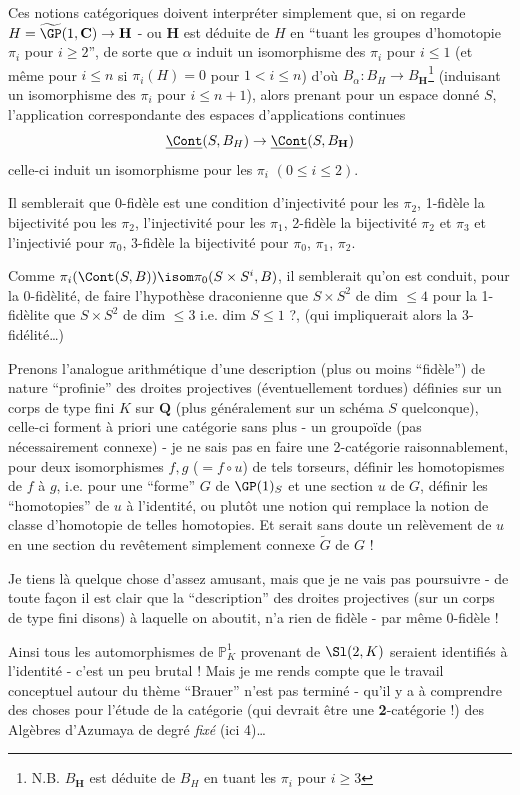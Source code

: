 Ces notions catégoriques doivent interpréter simplement que, si on regarde $H = \widetilde{\GP}(1, \mathbf{C}) \to \mathbf{H}$ - ou $\mathbf{H}$ est déduite de $H$ en ``tuant les groupes d'homotopie $\pi_i$ pour $i \geq 2$'', de sorte que $\alpha$ induit un isomorphisme des $\pi_i$ pour $i \leq 1$ (et même pour $i \leq n$ si $\pi_i (H) = 0$ pour $1 < i \leq n$) d'où $B_\alpha: B_H \to B_{\mathbf{H}}$\footnote{N.B. $B_{\mathbf{H}}$ est déduite de $B_H$ en tuant les $\pi_i$ pour $i \geq 3$} (induisant un isomorphisme des $\pi_i$ pour $i \leq n + 1$), alors prenant pour un espace donné $S$, l'application correspondante des espaces d'applications continues
$$
\underline{\Cont} (S, B_H) \to \underline{\Cont}(S, B_{\mathbf{H}})
$$
celle-ci induit un isomorphisme pour les $\pi_i$ $(0 \leq i \leq 2)$.

Il semblerait que 0-fidèle est une condition d'injectivité pour les $\pi_2$, 1-fidèle la bijectivité pou les $\pi_2$, l'injectivité pour les $\pi_1$, 2-fidèle la bijectivité $\pi_2$ et $\pi_3$ et l'injectivié pour $\pi_0$, 3-fidèle la bijectivité pour $\pi_0$, $\pi_1$, $\pi_2$.

Comme $\pi_i (\Cont (S, B)) \isom \pi_0 (S \times S^i, B)$, il semblerait qu'on est conduit, pour la 0-fidèlité, de faire l'hypothèse draconienne que $S \times S^2$ de dim $\leq 4$ pour la 1-fidèlite que $S \times S^2$ de dim $\leq 3$ i.e. dim $S \leq 1$ ?, (qui impliquerait alors la 3-fidélité\dots)

Prenons l'analogue arithmétique d'une description (plus ou moins ``fidèle'') de nature ``profinie'' des droites projectives (éventuellement tordues) définies sur un corps de type fini $K$ sur $\mathbf{Q}$ (plus généralement sur un schéma $S$ quelconque), celle-ci forment à priori une catégorie sans plus - un groupoïde (pas nécessairement connexe) - je ne sais pas en faire une 2-catégorie raisonnablement, pour deux isomorphismes $f, g$ ($= f \circ u$) de tels torseurs, définir les homotopismes de $f$ à $g$, i.e. pour une ``forme'' $G$ de $\GP (1)_S$ et une section $u$ de $G$, définir les ``homotopies'' de $u$ à l'identité, ou plutôt une notion qui remplace la notion de classe d'homotopie de telles homotopies. Et serait sans doute un relèvement de $u$ en une section du revêtement simplement connexe $\widetilde{G}$ de $G$ !

Je tiens là quelque chose d'assez amusant, mais que je ne vais pas poursuivre - de toute fa\c{c}on il est clair que la ``description'' des droites projectives (sur un corps de type fini disons) à laquelle on aboutit, n'a rien de fidèle - par même 0-fidèle !

Ainsi tous les automorphismes de $\mathbb{P}^1_K$ provenant de $\Sl (2, K)$ seraient identifiés à l'identité - c'est un peu brutal ! Mais je me rends compte que le travail conceptuel autour du thème ``Brauer'' n'est pas terminé - qu'il y a à comprendre des choses pour l'étude de la catégorie (qui devrait être une {\bf 2}-catégorie !) des Algèbres d'Azumaya de degré \emph{fixé} (ici 4)\dots 



